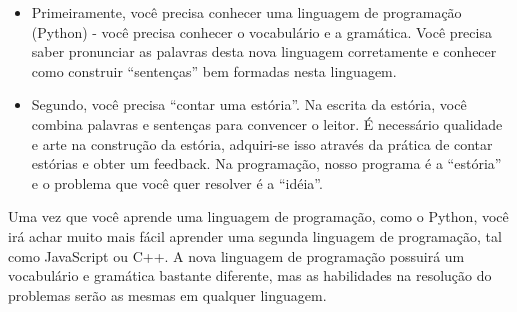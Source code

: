 \begin{itemize}
%

\item Primeiramente, você precisa conhecer uma linguagem de programação (Python) -
você precisa conhecer o vocabulário e a gramática. Você precisa saber
pronunciar as palavras desta nova linguagem corretamente e conhecer como construir
``sentenças'' bem formadas nesta linguagem.
%

\item Segundo, você precisa ``contar uma estória''. Na escrita da estória,
você combina palavras e sentenças para convencer o leitor.
É necessário qualidade e arte na construção da estória, adquiri-se
isso através da prática de contar estórias e obter um feedback.
Na programação, nosso programa é a ``estória'' e o problema que você
quer resolver é a ``idéia''.
%

\end{itemize}
%

Uma vez que você aprende uma linguagem de programação, como o Python, você irá
achar muito mais fácil aprender uma segunda linguagem de programação, tal como
JavaScript ou C++. A nova linguagem de programação possuirá um vocabulário
e gramática bastante diferente, mas as habilidades na resolução do problemas
serão as mesmas em qualquer linguagem.
%

